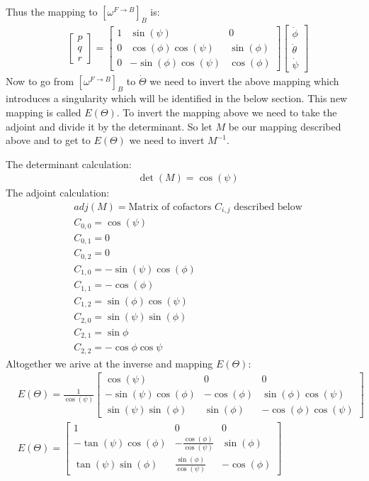 \documentclass{article}
\begin{document}
Thus the mapping to $[\omega^{F \to B}]_B$ is:
\begin{align*}
    & \begin{bmatrix}p \\ q \\ r\end{bmatrix} = \begin{bmatrix} 1 & \sin(\psi) & 0 \\ 0 & \cos(\phi) \cos(\psi) & \sin(\phi) \\ 0 & -\sin(\phi) \cos(\psi) & \cos(\phi) \end{bmatrix} \begin{bmatrix} \dot{\phi} \\ \dot{\theta} \\ \dot{\psi}\end{bmatrix}
\end{align*}
Now to go from $[\omega^{F \to B}]_B$ to $\dot{\Theta}$ we need to invert the above mapping which introduces a singularity which will be identified in the below section. This new mapping is called $E(\Theta)$. To invert the mapping above we need to take the adjoint and divide it by the determinant. So let $M$ be our mapping described above and to get to $E(\Theta)$ we need to invert $M^{-1}$.

The determinant calculation:
\begin{align*}
    & \det(M) = \cos(\psi)
\end{align*}
The adjoint calculation:
\begin{align*}
    & adj(M) = \text{Matrix of cofactors } C_{i,j} \text{ described below} \\
    & C_{0,0} = \cos(\psi) \\
    & C_{0,1} = 0 \\
    & C_{0,2} = 0 \\
    & C_{1,0} = -\sin(\psi) \cos(\phi) \\
    & C_{1,1} = -\cos(\phi) \\
    & C_{1,2} = \sin(\phi) \cos(\psi) \\
    & C_{2,0} = \sin(\psi) \sin(\phi) \\
    & C_{2,1} = \sin{\phi} \\
    & C_{2,2} = -\cos{\phi} \cos{\psi}
\end{align*}
Altogether we arive at the inverse and mapping $E(\Theta)$:
\begin{align*}
    & E(\Theta) = \frac{1}{\cos(\psi)} \begin{bmatrix} \cos(\psi) & 0 & 0 \\ -\sin(\psi) \cos(\phi) & -\cos(\phi) & \sin(\phi) \cos(\psi) \\ \sin(\psi) \sin(\phi) & \sin(\phi) & -\cos(\phi) \cos(\psi)\end{bmatrix} \\
    & E(\Theta) = \begin{bmatrix} 1 & 0 & 0 \\ -\tan(\psi) \cos(\phi) & -\frac{\cos(\phi)}{\cos(\psi)} & \sin(\phi) \\ \tan(\psi) \sin(\phi) & \frac{\sin(\phi)}{\cos(\psi)} & -\cos(\phi) \end{bmatrix}
\end{align*}
\end{document}
